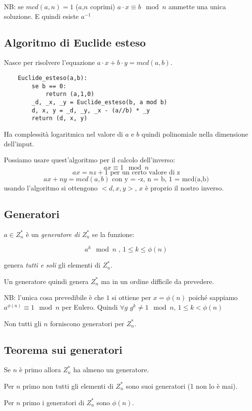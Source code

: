 NB: se $mcd(a,n)=1$ ($a$,$n$ coprimi) $a \cdot x \equiv b \mod n$ ammette una unica soluzione. E quindi esiste $a^{-1}$


\subsection{Algoritmo di Euclide esteso}
Nasce per risolvere l'equazione $a \cdot x + b \cdot y = mcd(a,b)$.
\begin{verbatim}
    Euclide_esteso(a,b):
        se b == 0:
            return (a,1,0)
        _d, _x, _y = Euclide_esteso(b, a mod b)
        d, x, y = _d, _y, _x - (a//b) * _y
        return (d, x, y)
\end{verbatim}
Ha complessità logaritmica nel valore di $a$ e $b$ quindi polinomiale nella dimensione dell'input.

Possiamo usare quest'algoritmo per il calcolo dell'inverso:
$$ ax \equiv 1 \mod n $$
$$ ax = nz + 1 \text{ per un certo valore di z} $$
$$ ax + ny = mcd(a,b) \text{ con y = -z, n = b, 1 = mcd(a,b)} $$
usando l'algoritmo si ottengono $<d, x, y>$, $x$ è proprio il nostro inverso.

\subsection{Generatori}
$a \in Z_{n}^*$ è un \emph{generatore di $Z_{n}^*$} se la funzione:

$$ a^k \mod n \text{ , } 1 \leq k \leq \phi(n) $$

genera \emph{tutti e soli} gli elementi di $Z_{n}^*$.

Un generatore quindi genera $Z_{n}^*$ ma in un ordine difficile da prevedere.

NB: l'unica cosa prevedibile è che $1$ si ottiene per $x = \phi(n)$ poiché sappiamo $a^{\phi(n)} \equiv 1 \mod n$ per Eulero. Quindi $\forall g$ $g^k \neq 1 \mod n$, $ 1 \leq k < \phi(n)$

Non tutti gli $n$ forniscono generatori per $Z_{n}^*$.

\subsection{Teorema sui generatori}
Se $n$ è primo allora $Z_{n}^*$ ha almeno un generatore.

Per $n$ primo non tutti gli elementi di $Z_n^*$ sono suoi generatori (1 non lo è mai).

Per $n$ primo i generatori di $Z_n^*$ sono $\phi(n)$.

